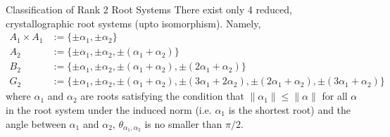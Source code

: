 \begin{namedtheorem}{Classification of Rank 2 Root Systems}
    There exist only 4 reduced, crystallographic root systems (upto isomorphism). Namely,
    \begin{equation*}
    \begin{aligned}
        A_1 \times A_1 &:= \{\pm \alpha_1, \pm \alpha_2 \} \\
        A_2 &:= \{\pm \alpha_1, \pm \alpha_2, \pm (\alpha_1 + \alpha_2) \} \\
        B_2 &:= \{\pm \alpha_1, \pm \alpha_2, \pm (\alpha_1 + \alpha_2), \pm (2 \alpha_1 + \alpha_2) \} \\
        G_2 &:= \{
            \pm \alpha_1,
            \pm \alpha_2,
            \pm (\alpha_1 + \alpha_2),
            \pm (3\alpha_1 + 2\alpha_2),
            \pm (2\alpha_1 + \alpha_2),
            \pm (3\alpha_1 + \alpha_2)
        \}
    \end{aligned}
    \end{equation*}
    where $\alpha_1$ and $\alpha_2$ are roots satisfying the condition that $\|\alpha_1\| \leq \|\alpha\|$ for all $\alpha$ in
    the root system under the induced norm (i.e. $\alpha_1$ is the shortest root) and the angle between $\alpha_1$ and $\alpha_2$,
    $\theta_{\alpha_1, \alpha_2}$ is no smaller than $\pi / 2$.
\end{namedtheorem}

